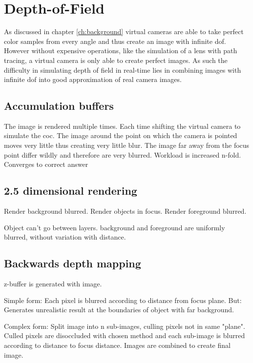 \chapter{Depth-of-Field}
As discussed in chapter \ref{ch:background} virtual cameras are able to take perfect color samples from every angle and thus create an image with infinite \gls{dof}.
However without expensive operations, like the simulation of a lens with path tracing, a virtual camera is only able to create perfect images.
As such the difficulty in simulating depth of field in real-time lies in combining images with infinite \gls{dof} into good approximation of real camera images.
\section{Accumulation buffers}
The image is rendered multiple times.
Each time shifting the virtual camera to simulate the \gls{coc}.
The image around the point on which the camera is pointed moves very little thus creating very little blur.
The image far away from the focus point differ wildly and therefore are very blurred.
Workload is increased n-fold. Converges to correct answer

\section{2.5 dimensional rendering}
Render background blurred.
Render objects in focus.
Render foreground blurred.

Object can't go between layers.
background and foreground are uniformly blurred, without variation with distance.

\section{Backwards depth mapping}
z-buffer is generated with image.

Simple form: Each pixel is blurred according to distance from focus plane.
But: Generates unrealistic result at the boundaries of object with far background.

Complex form: Split image into n sub-images, culling pixels not in same "plane".
Culled pixels are disoccluded with chosen method and each sub-image is blurred according to distance to focus distance.
Images are combined to create final image.

